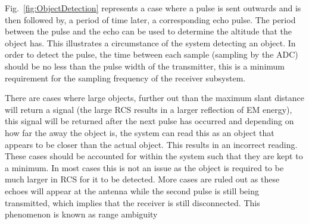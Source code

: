 \documentclass[11pt]{witseiepaper}
\begin{document}
\begin{bibunit}[witseie]
Fig.~\ref{fig:ObjectDetection} represents a case where a pulse is sent outwards and is then followed by, a period of time later, a corresponding echo pulse.
The period between the pulse and the echo can be used to determine the altitude that the object has. This illustrates a circumstance of the system detecting an object.
In order to detect the pulse, the time between each sample (sampling by the ADC) should be no less than the pulse width of the transmitter, this is a minimum requirement for the sampling frequency of the receiver subsystem.

There are cases where large objects, further out than the maximum slant distance will return a signal (the large RCS results in a larger reflection of EM energy), this signal will be returned after the next pulse has occurred and depending on how far the away the object is, the system can read this as an object that appears to be closer than the actual object. This results in an incorrect reading. These cases should be accounted for within the system such that they are kept to a minimum. In most cases this is not an issue as the object is required to be much larger in RCS for it to be detected. More cases are ruled out as these echoes will appear at the antenna while the second pulse is still being transmitted, which implies that the receiver is still disconnected.
This phenomenon is known as range ambiguity \cite[p.~22]{radarHandbook}


\end{bibunit}
\end{document}
